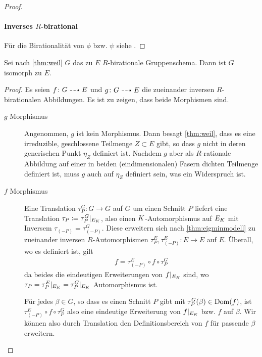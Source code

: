 \begin{Lemma}
\begin{proof}
    \paragraph{Inverses $R$-birational}
    Für die Birationalität von $\phi$ bzw. $\psi$ siehe
    \cite[Propsition IV.6.10]{silverman2}.
  \end{proof}
\end{Lemma}

\begin{Lemma}\label{thm:äqgruppenschema}
  Sei nach \ref{thm:weil} $G$ das zu $E$ $R$-birationale
  Gruppenschema. Dann ist $G$ isomorph zu $E$.
  \begin{proof}
    Es seien $f\colon G\dashrightarrow E$ und $g\colon G\dashrightarrow E$ die
    zueinander inversen $R$-birationalen Abbildungen.
    Es ist zu zeigen, dass beide Morphismen sind.
    \begin{description}
    \item[$g$ Morphismus] Angenommen, $g$ ist kein
      Morphismus. Dann besagt \ref{thm:weil}, dass es eine
      irreduzible, geschlossene Teilmenge $Z\subset E$ gibt, so
      dass $g$ nicht in deren generischen Punkt $\eta_Z$ definiert
      ist. Nachdem $g$ aber als $R$-rationale Abbildung auf einer
      in beiden (eindimensionalen) Fasern dichten Teilmenge
      definiert ist, muss $g$ auch auf $\eta_Z$ definiert sein,
      was ein Widerspruch ist.
    \item[$f$ Morphismus] Eine Translation $\tau_P^G\colon G\to G$
      auf $G$ um einen Schnitt $P$ liefert eine Translation
      $\tau_P\coloneqq\tau_P^G|_{E_{K}}$, also einen
      $K$-Automorphismus auf $E_{K}$ mit Inversem
      $\tau_{(-P)}=\tau_{(-P)}^G$. Diese 
      erweitern sich nach \ref{thm:eigminmodell} zu zueinander
      inversen $R$-Automorphismen
      $\tau_P^E,\tau_{(-P)}^E\colon E\to E$ auf $E$.
      Überall, wo es definiert ist, gilt
      \begin{gather*}
        f = \tau_{(-P)}^E\circ f\circ \tau_P^G
      \end{gather*}
      da beides die eindeutigen Erweiterungen von $f|_{E_{K}}$
      sind, wo $\tau_P=\tau_P^E|_{E_{K}}=\tau_P^G|_{E_{K}}$
      Automorphismus ist.
      
      Für jedes $\beta\in G$, so dass es einen Schnitt $P$ gibt mit
      $\tau_P^G(\beta)\in\operatorname{Dom}(f)$, ist $\tau_{(-P)}^E\circ f\circ
      \tau_P^G$ also eine eindeutige Erweiterung von $f|_{E_{K}}$
      bzw. $f$ auf $\beta$.
      Wir können also durch Translation den Definitionsbereich von
      $f$ für passende $\beta$ erweitern.


\end{description}
\end{proof}
\end{Lemma}

